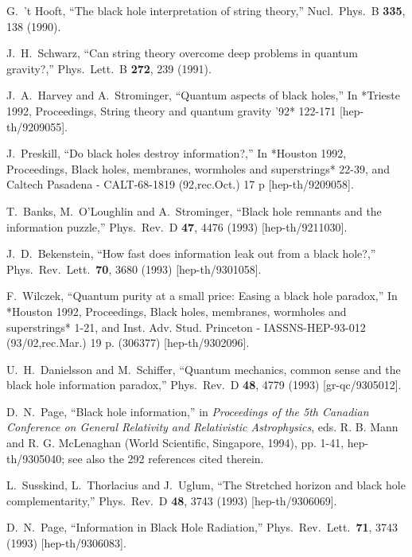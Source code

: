 \documentclass[12pt]{article}
\begin{document}
\begin{thebibliography}{99}
  G.~'t Hooft,
  ``The black hole interpretation of string theory,''
  Nucl.\ Phys.\ B {\bf 335}, 138 (1990).
  
  J.~H.~Schwarz,
  ``Can string theory overcome deep problems in quantum gravity?,''
  Phys.\ Lett.\ B {\bf 272}, 239 (1991). 
  
  J.~A.~Harvey and A.~Strominger,
  ``Quantum aspects of black holes,''
  In *Trieste 1992, Proceedings, String theory and quantum gravity '92* 122-171
  [hep-th/9209055].  
 
  J.~Preskill,
  ``Do black holes destroy information?,''
  In *Houston 1992, Proceedings, Black holes, membranes, wormholes and superstrings* 22-39, and Caltech Pasadena - CALT-68-1819 (92,rec.Oct.) 17 p
  [hep-th/9209058].
  
  T.~Banks, M.~O'Loughlin and A.~Strominger,
  ``Black hole remnants and the information puzzle,''
  Phys.\ Rev.\ D {\bf 47}, 4476 (1993)
  [hep-th/9211030].
  
  J.~D.~Bekenstein,
  ``How fast does information leak out from a black hole?,''
  Phys.\ Rev.\ Lett.\  {\bf 70}, 3680 (1993)
  [hep-th/9301058].
  
  F.~Wilczek,
  ``Quantum purity at a small price: Easing a black hole paradox,''
  In *Houston 1992, Proceedings, Black holes, membranes, wormholes and superstrings* 1-21, and Inst. Adv. Stud. Princeton - IASSNS-HEP-93-012 (93/02,rec.Mar.) 19 p. (306377)
  [hep-th/9302096]. 

  U.~H.~Danielsson and M.~Schiffer,
  ``Quantum mechanics, common sense and the black hole information paradox,''
  Phys.\ Rev.\ D {\bf 48}, 4779 (1993)
  [gr-qc/9305012].
  
  D.~N.~Page,
  ``Black hole information,''
  in {\it Proceedings of the 5th Canadian Conference on General Relativity and
  Relativistic Astrophysics}, eds. R. B. Mann and R. G. McLenaghan
  (World Scientific, Singapore, 1994), pp. 1-41, hep-th/9305040;
  see also the 292 references cited therein.
  
  L.~Susskind, L.~Thorlacius and J.~Uglum,
  ``The Stretched horizon and black hole complementarity,''
  Phys.\ Rev.\ D {\bf 48}, 3743 (1993)
  [hep-th/9306069].
  
  D.~N.~Page,
  ``Information in Black Hole Radiation,''
  Phys.\ Rev.\ Lett.\  {\bf 71}, 3743 (1993)
  [hep-th/9306083].
  

\end{thebibliography}
\end{document}
